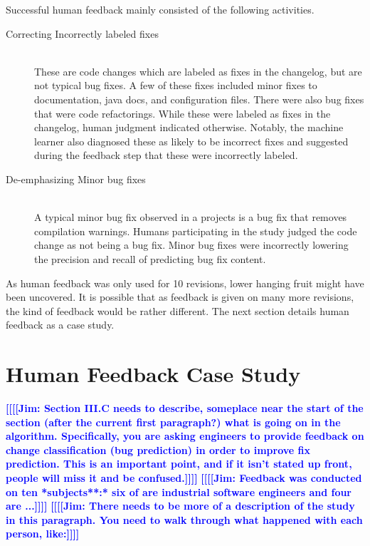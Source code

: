 \documentclass[10pt, conference, letterpaper, compsocconf]{IEEEtran}
\newcommand{\todoc}[2]{{\textcolor{#1} {\textbf{[[#2]]}}}}
\newcommand{\todoblue}[1]{\todoc{blue}{\textbf{[[#1]]}}}
\newcommand{\jim}[1]{\todoblue{Jim: #1}}
\begin{document}
Successful human feedback mainly consisted of the following activities.
\begin{description}
\item[Correcting Incorrectly labeled fixes] \hfill \\
These are code changes which are labeled as fixes in the changelog, but are not typical bug fixes.
A few of these fixes included minor fixes to documentation, java docs, and configuration files. There were also bug fixes that were code refactorings.
While these were labeled as fixes in the changelog, human judgment indicated otherwise.
Notably, the machine learner also diagnosed these as likely to be incorrect fixes and suggested during the feedback step that these were incorrectly labeled.

\item[De-emphasizing Minor bug fixes] \hfill \\
A typical minor bug fix observed in a projects is a bug fix that removes compilation warnings.
Humans participating in the study judged the code change as not being a bug fix.
Minor bug fixes were incorrectly lowering the precision and recall of predicting bug fix content.
\end{description}

As human feedback was only used for 10 revisions, lower hanging fruit might have been uncovered. It is possible that as feedback is given on many more revisions, the kind of feedback would be rather different. The
next section details human feedback as a case study.

\section{Human Feedback Case Study}
\jim{Section III.C needs to describe, someplace near the start of the section (after the current first paragraph?) what is going on in the algorithm. Specifically, you are asking engineers to provide feedback on change classification (bug prediction) in order to improve fix prediction. This is an important point, and if it isn't stated up front, people will miss it and be confused.}
\jim{Feedback was conducted on ten *subjects**:* six of are industrial software engineers and four are ...}
\jim{There needs to be more of a description of the study in this paragraph. You need to walk through what happened with each person, like:}
\end{document}
